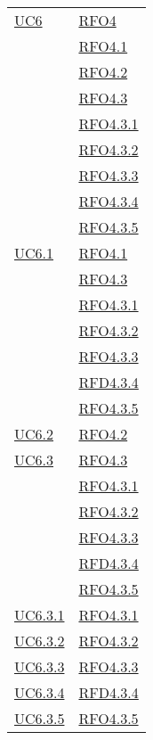 \begin{longtable}{|>{\centering}m{5cm}|m{5cm}<{\centering}|}
\hyperlink{UC6}{UC6} 
& \hyperlink{RFO4}{RFO4}\\
& \hyperlink{RFO4.1}{RFO4.1}\\
& \hyperlink{RFO4.2}{RFO4.2}\\
& \hyperlink{RFO4.3}{RFO4.3}\\
& \hyperlink{RFO4.3.1}{RFO4.3.1}\\
& \hyperlink{RFO4.3.2}{RFO4.3.2}\\
& \hyperlink{RFO4.3.3}{RFO4.3.3}\\
& \hyperlink{RFO4.3.4}{RFO4.3.4}\\
& \hyperlink{RFO4.3.5}{RFO4.3.5}\\\hline

\hyperlink{UC6.1}{UC6.1} 
& \hyperlink{RFO4.1}{RFO4.1}\\
& \hyperlink{RFO4.3}{RFO4.3}\\
& \hyperlink{RFO4.3.1}{RFO4.3.1}\\
& \hyperlink{RFO4.3.2}{RFO4.3.2}\\
& \hyperlink{RFO4.3.3}{RFO4.3.3}\\
& \hyperlink{RFD4.3.4}{RFD4.3.4}\\
& \hyperlink{RFO4.3.5}{RFO4.3.5}\\ \hline

\hyperlink{UC6.2}{UC6.2} 
& \hyperlink{RFO4.2}{RFO4.2}\\ \hline

\hyperlink{UC6.3}{UC6.3} 
& \hyperlink{RFO4.3}{RFO4.3}\\
& \hyperlink{RFO4.3.1}{RFO4.3.1}\\
& \hyperlink{RFO4.3.2}{RFO4.3.2}\\
& \hyperlink{RFO4.3.3}{RFO4.3.3}\\
& \hyperlink{RFD4.3.4}{RFD4.3.4}\\
& \hyperlink{RFO4.3.5}{RFO4.3.5}\\ \hline

\hyperlink{UC6.3.1}{UC6.3.1} & \hyperlink{RFO4.3.1}{RFO4.3.1}\\ \hline
\hyperlink{UC6.3.2}{UC6.3.2} & \hyperlink{RFO4.3.2}{RFO4.3.2}\\ \hline
\hyperlink{UC6.3.3}{UC6.3.3} & \hyperlink{RFO4.3.3}{RFO4.3.3}\\ \hline
\hyperlink{UC6.3.4}{UC6.3.4} & \hyperlink{RFD4.3.4}{RFD4.3.4}\\ \hline
\hyperlink{UC6.3.5}{UC6.3.5} & \hyperlink{RFO4.3.5}{RFO4.3.5}\\ \hline


\end{longtable}
